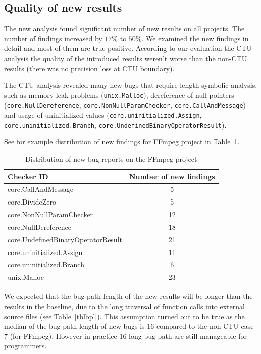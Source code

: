 \documentclass{article}
\begin{document}
\subsection{Quality of new results}
The new analysis found significant number of new results on all projects. 
The number of findings increased by $17\%$ to $50\%$.
We examined the new findings in detail and most of them are true positive.
According to our evaluation the CTU analysis the quality of the introduced results
weren't worse than the non-CTU results (there was no precision loss at CTU boundary).

The CTU analysis revealed many new bugs that require length symbolic analysis,
such as memory leak problems (\texttt{unix.Malloc}), dereference of null pointers
(\texttt{core.NullDereference}, \texttt{core.NonNullParamChecker},
\texttt{core.CallAndMessage}) \\ and usage of uninitialized values
(\texttt{core.uninitialized.Assign}, \\ \texttt{core.uninitialized.Branch},
\texttt{core.UndefinedBinaryOperatorResult}).

See for example distribution of new findings for FFmpeg project in 
Table~\ref{tblffmpegbugs}.

\begin {table}[h!]
\centering
\begin{tabular}{| l|| c |}
\hline
Checker ID&                          Number of new findings \\
\hline
\hline
core.CallAndMessage                &  5 \\
\hline
core.DivideZero                    & 5 \\     
\hline
core.NonNullParamChecker           & 12 \\     
\hline
core.NullDereference               & 18 \\     
\hline
core.UndefinedBinaryOperatorResult & 21 \\     
\hline
core.uninitialized.Assign          & 11 \\     
\hline
core.uninitialized.Branch          & 6  \\     
\hline
unix.Malloc                        & 23 \\
\hline
\end{tabular}
\caption{Distribution of new bug reports on the FFmpeg project}
\label{tblffmpegbugs}
\end{table}

We expected that the bug path length of the new results will be longer 
than the results in the baseline, due to the long traversal of function 
calls into external source files (see Table~\ref{tblbpl}). This assumption turned out to be true as
the median of the bug path length of new bugs is 16 compared to the non-CTU
case 7 (for FFmpeg). However in practice 16 long bug path are still 
manageable for programmers.
\end{document}
